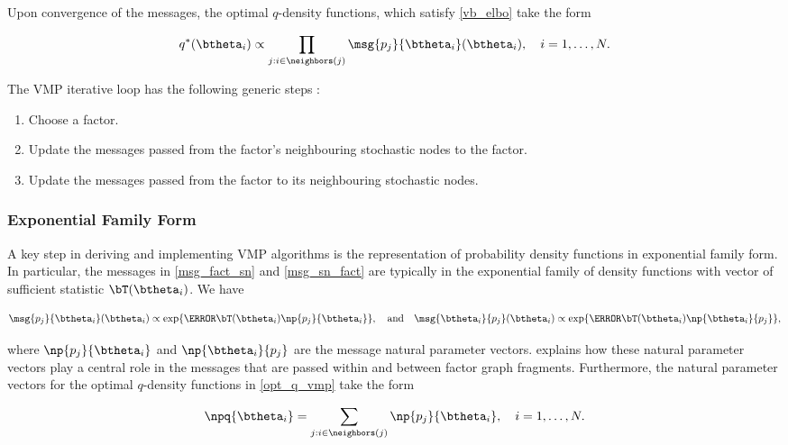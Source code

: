 \documentclass[12pt]{article}
\theoremstyle{plain}
\theoremstyle{definition}
\theoremstyle{remark}
\begin{document}
\noindent Upon convergence of the messages, the optimal $q$-density functions, which satisfy \eqref{vb_elbo}
take the form

\begin{equation}
	q^* (\btheta_i) \propto \prod_{j : i \in \neighbors(j)} \msg{p_j}{\btheta_i} (\btheta_i), \quad i = 1, \dots, N.
\label{opt_q_vmp}
\end{equation}

\noindent The VMP iterative loop has the following generic steps \cite{minka05, wand17}:

\begin{enumerate}
	\item Choose a factor.
	\item Update the messages passed from the factor's neighbouring stochastic nodes to the factor.
	\item Update the messages passed from the factor to its neighbouring stochastic nodes.
\end{enumerate}


\subsubsection{Exponential Family Form}
\label{sec:exp_fam_form}

A key step in deriving and implementing VMP algorithms is the representation of probability density functions
in exponential family form. In particular, the messages in \eqref{msg_fact_sn} and \eqref{msg_sn_fact}
are typically in the exponential family of density functions with vector of sufficient statistic $\bT (\btheta_i)$. We have

\[
	\msg{p_j}{\btheta_i} (\btheta_i)
		\propto
			\exp \{ \T{\bT (\btheta_i)} \np{p_j}{\btheta_i} \}, \quad
	\text{and} \quad
	\msg{\btheta_i}{p_j} (\btheta_i)
		\propto
			\exp \{ \T{\bT (\btheta_i)} \np{\btheta_i}{p_j} \},
\]

\noindent where $\np{p_j}{\btheta_i}$ and $\np{\btheta_i}{p_j}$ are the message natural parameter vectors.
 explains how these natural parameter vectors play a central role in the messages that are
passed within and between factor graph fragments. Furthermore, the natural parameter vectors for the
optimal $q$-density functions in \eqref{opt_q_vmp} take the form

\begin{equation}
	\npq{\btheta_i} = \sum_{j : i \in \neighbors(j)} \np{p_j}{\btheta_i}, \quad i = 1, \dots, N.
\label{etaq}
\end{equation}
\end{document}

